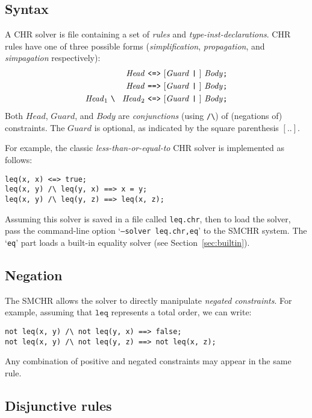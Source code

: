 \documentclass{article}
\newcommand{\bs}[0]{\symbol{92}~}
\begin{document}
\subsection{Syntax}

A CHR solver is file containing a set of \emph{rules} and
\emph{type-inst-declarations}.
CHR rules have one of three possible forms (\emph{simplification},
    \emph{propagation}, and \emph{simpagation} respectively):
\begin{align*}
\mathit{Head} & ~\texttt{<=>}~ [\mathit{Guard} ~\texttt{|}~]~\mathit{Body}
    \texttt{;} \\
\mathit{Head} & ~\texttt{==>}~ [\mathit{Guard} ~\texttt{|}~]~\mathit{Body}
    \texttt{;} \\
\mathit{Head}_1~\texttt{\bs}~\mathit{Head}_2 & ~\texttt{<=>}~
    [\mathit{Guard}~\texttt{|}~]~\mathit{Body} \texttt{;} 
\end{align*}
Both $\mathit{Head}$, $\mathit{Guard}$, and $\mathit{Body}$ are
\emph{conjunctions} (using \verb+/\+) of (negations of) constraints.
The $\mathit{Guard}$ is optional, as indicated by the square
parenthesis $[ .. ]$.

For example, the classic \emph{less-than-or-equal-to} CHR solver is
implemented as follows:
\begin{verbatim}
leq(x, x) <=> true;
leq(x, y) /\ leq(y, x) ==> x = y;
leq(x, y) /\ leq(y, z) ==> leq(x, z);
\end{verbatim}
Assuming this solver is saved in a file called \texttt{leq.chr}, then to
load the solver, pass the command-line option `\texttt{--solver leq.chr,eq}'
to the SMCHR system.
The `\texttt{eq}' part loads a built-in equality solver
(see Section~\ref{sec:builtin}).

\subsection{Negation}

The SMCHR allows the solver to directly manipulate \emph{negated constraints}.
For example, assuming that $\mathtt{leq}$ represents a total order, we can
write:
\begin{verbatim}
not leq(x, y) /\ not leq(y, x) ==> false;
not leq(x, y) /\ not leq(y, z) ==> not leq(x, z);
\end{verbatim}
Any combination of positive and negated constraints may appear in the same
rule.

\subsection{Disjunctive rules}
\end{document}
